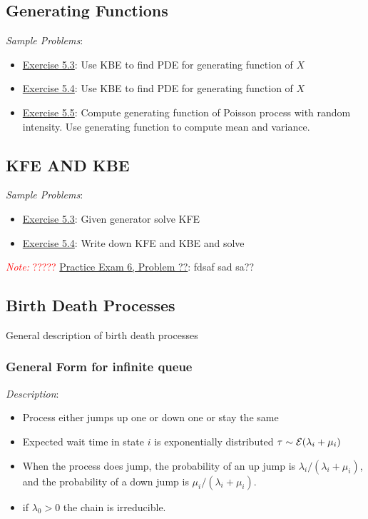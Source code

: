 \documentclass[12pt]{article}
\newcommand{\note}[1]{\textcolor{red}{\textit{Note:} #1}}
\begin{document}
\subsection{Generating Functions}
\textit{Sample Problems}: 
\begin{itemize}[nolistsep]
    \item \hyperref[Exercise 5.3]{Exercise 5.3}: Use KBE to find PDE for generating function of \( X \)
    \item \hyperref[Exercise 5.4]{Exercise 5.4}: Use KBE to find PDE for generating function of \( X \)
    \item \hyperref[Exercise 5.5]{Exercise 5.5}: Compute generating function of Poisson process with random intensity. Use generating function to compute mean and variance.
\end{itemize}



\subsection{KFE AND KBE}
\textit{Sample Problems}: 
\begin{itemize}[nolistsep]
    \item \hyperref[Exercise 5.3]{Exercise 5.3}: Given generator solve KFE
    \item \hyperref[Exercise 5.4]{Exercise 5.4}: Write down KFE and KBE and solve
\end{itemize}


\note{?????}
\hyperref[Practice Exam 6, Problem 1]{Practice Exam 6, Problem ??}:  fdsaf sad sa??


\subsection{Birth Death Processes}

General description of birth death processes

\subsubsection{General Form for infinite queue}
\textit{Description}:
\begin{itemize}[nolistsep]
    \item Process either jumps up one or down one or stay the same
    \item Expected wait time in state \( i \) is exponentially distributed \( \tau \sim \mathcal{E}( \lambda_i + \mu_i) \)
    \item When the process does jump, the probability of an up jump is \( \lambda_i / (\lambda_i+\mu_i) \), and the probability of a down jump is \( \mu_i / (\lambda_i+\mu_i) \).
    \item if \( \lambda_0 > 0 \) the chain is irreducible.
\end{itemize}
\end{document}
